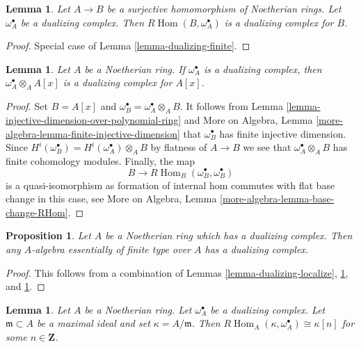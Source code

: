 \documentclass{stacks-project}
\theoremstyle{plain}
\newtheorem{proposition}[subsection]{Proposition}
\newtheorem{lemma}[subsection]{Lemma}
\theoremstyle{definition}
\theoremstyle{remark}
\numberwithin{equation}{subsection}
\def\Hom{\mathop{\mathrm{Hom}}\nolimits}
\begin{document}
\begin{lemma}
\label{lemma-dualizing-quotient}
Let $A \to B$ be a surjective homomorphism of Noetherian rings.
Let $\omega_A^\bullet$ be a dualizing complex.
Then $R\Hom(B, \omega_A^\bullet)$ is a dualizing complex for $B$.
\end{lemma}

\begin{proof}
Special case of Lemma \ref{lemma-dualizing-finite}.
\end{proof}

\begin{lemma}
\label{lemma-dualizing-polynomial-ring}
Let $A$ be a Noetherian ring. If $\omega_A^\bullet$ is a dualizing
complex, then $\omega_A^\bullet \otimes_A A[x]$ is a dualizing
complex for $A[x]$.
\end{lemma}

\begin{proof}
Set $B = A[x]$ and $\omega_B^\bullet = \omega_A^\bullet \otimes_A B$.
It follows from Lemma \ref{lemma-injective-dimension-over-polynomial-ring}
and More on Algebra, Lemma \ref{more-algebra-lemma-finite-injective-dimension}
that $\omega_B^\bullet$ has finite injective dimension.
Since $H^i(\omega_B^\bullet) = H^i(\omega_A^\bullet) \otimes_A B$
by flatness of $A \to B$ we see that $\omega_A^\bullet \otimes_A B$
has finite cohomology modules. Finally, the map
$$
B \longrightarrow R\Hom_B(\omega_B^\bullet, \omega_B^\bullet)
$$
is a quasi-isomorphism as formation of internal hom commutes with
flat base change in this case, see
More on Algebra, Lemma \ref{more-algebra-lemma-base-change-RHom}.
\end{proof}

\begin{proposition}
\label{proposition-dualizing-essentially-finite-type}
Let $A$ be a Noetherian ring which has a dualizing complex.
Then any $A$-algebra essentially of finite type over $A$
has a dualizing complex.
\end{proposition}

\begin{proof}
This follows from a combination of
Lemmas \ref{lemma-dualizing-localize},
\ref{lemma-dualizing-quotient}, and \ref{lemma-dualizing-polynomial-ring}.
\end{proof}

\begin{lemma}
\label{lemma-find-function}
Let $A$ be a Noetherian ring. Let $\omega_A^\bullet$ be a dualizing
complex. Let $\mathfrak m \subset A$ be a maximal ideal and set
$\kappa = A/\mathfrak m$. Then
$R\Hom_A(\kappa, \omega_A^\bullet) \cong \kappa[n]$ for some
$n \in \mathbf{Z}$.
\end{lemma}
\end{document}
